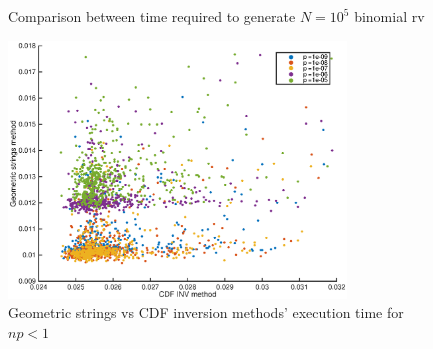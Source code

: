\documentclass[10pt]{article}
\begin{document}
\begin{figure}[h]
  \centering
  \caption{Comparison between time required to generate $N = 10^5$ binomial rv}
  \label{fig:bin}
\end{figure}

\begin{figure}[h]
  \centering
  \includegraphics[width = 0.8\textwidth]{images/bin_smallp}
  \caption{Geometric strings vs CDF inversion methods' execution time for $np < 1$}
  \label{fig:bin_small}
\end{figure}
\end{document}
